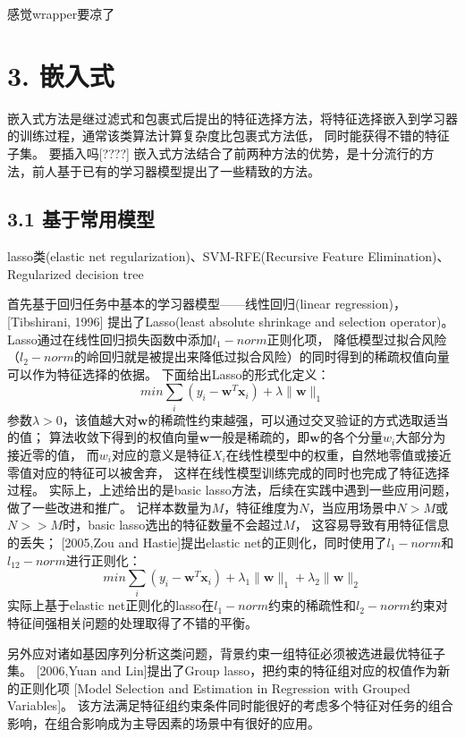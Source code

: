 \documentclass[a4paper,UTF8]{article}
\begin{document}
感觉wrapper要凉了



\section*{3. 嵌入式}

嵌入式方法是继过滤式和包裹式后提出的特征选择方法，将特征选择嵌入到学习器的训练过程，通常该类算法计算复杂度比包裹式方法低，
同时能获得不错的特征子集。
要插入吗[????]
嵌入式方法结合了前两种方法的优势，是十分流行的方法，前人基于已有的学习器模型提出了一些精致的方法。

\subsection*{3.1 基于常用模型}

lasso类(elastic net regularization)、SVM-RFE(Recursive Feature Elimination)、Regularized decision tree

首先基于回归任务中基本的学习器模型——线性回归(linear regression)，[Tibshirani, 1996]
提出了Lasso(least absolute shrinkage and selection operator)。
Lasso通过在线性回归损失函数中添加$l_{1}-norm$正则化项，
降低模型过拟合风险（$l_{2}-norm$的岭回归就是被提出来降低过拟合风险）的同时得到的稀疏权值向量可以作为特征选择的依据。
下面给出Lasso的形式化定义：
$$ min \sum_{i}(y_{i}-\textbf{w}^{T}\textbf{x}_{i})+\lambda \parallel \textbf{w} \parallel _{1} $$
参数$\lambda>0$，该值越大对$\textbf{w}$的稀疏性约束越强，可以通过交叉验证的方式选取适当的值；
算法收敛下得到的权值向量$\textbf{w}$一般是稀疏的，即$\textbf{w}$的各个分量$w_{i}$大部分为接近零的值，
而$w_{i}$对应的意义是特征$X_{i}$在线性模型中的权重，自然地零值或接近零值对应的特征可以被舍弃，
这样在线性模型训练完成的同时也完成了特征选择过程。
实际上，上述给出的是basic lasso方法，后续在实践中遇到一些应用问题，做了一些改进和推广。
记样本数量为$M$，特征维度为$N$，当应用场景中$N>M$或$N>>M$时，basic lasso选出的特征数量不会超过$M$，
这容易导致有用特征信息的丢失；
[2005,Zou and Hastie]提出elastic net的正则化，同时使用了$l_{1}-norm$和$l_{12}-norm$进行正则化：
$$ min \sum_{i}(y_{i}-\textbf{w}^{T}\textbf{x}_{i})+
\lambda_{1} \parallel \textbf{w} \parallel _{1} +\lambda_{2} \parallel \textbf{w} \parallel _{2} $$
实际上基于elastic net正则化的lasso在$l_{1}-norm$约束的稀疏性和$l_{2}-norm$约束对特征间强相关问题的处理取得了不错的平衡。

另外应对诸如基因序列分析这类问题，背景约束一组特征必须被选进最优特征子集。
[2006,Yuan and Lin]提出了Group lasso，把约束的特征组对应的权值作为新的正则化项
[Model Selection and Estimation in Regression with Grouped Variables]。
该方法满足特征组约束条件同时能很好的考虑多个特征对任务的组合影响，在组合影响成为主导因素的场景中有很好的应用。
\end{document}
